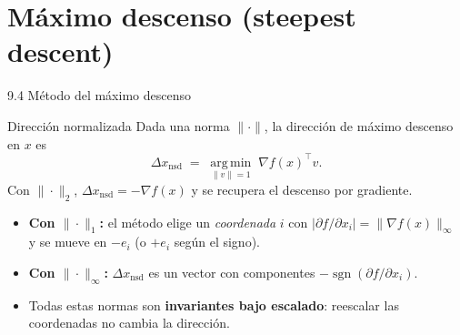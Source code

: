 \documentclass[10pt,aspectratio=169]{beamer}
\newcommand{\argmin}{\operatorname*{arg\,min}}
\begin{document}
\section{Máximo descenso (steepest descent)}
\begin{frame}{9.4 Método del máximo descenso}
  \begin{block}{Dirección normalizada}
    Dada una norma $\|\cdot\|$, la dirección de máximo descenso en $x$ es
    \[
      \Delta x_{\mathrm{nsd}} \;=\; \argmin_{\|v\|=1}\; \nabla f(x)^{\top} v.
    \]
    Con $\|\cdot\|_{2}$, $\Delta x_{\mathrm{nsd}} = -\nabla f(x)$ y se recupera el descenso
    por gradiente.
  \end{block}
  \begin{itemize}
    \item \textbf{Con $\|\cdot\|_{1}$:} el método elige un \emph{coordenada} $i$ con
          $|\partial f/\partial x_{i}| = \|\nabla f(x)\|_{\infty}$ y se mueve en $-e_{i}$
          (o $+e_{i}$ según el signo).
    \item \textbf{Con $\|\cdot\|_{\infty}$:} $\Delta x_{\mathrm{nsd}}$ es un vector con
          componentes $-\operatorname{sgn}(\partial f/\partial x_{i})$.
    \item Todas estas normas son \textbf{invariantes bajo escalado}: reescalar las
          coordenadas no cambia la dirección.
  \end{itemize}
  \begin{center}
  \end{center}
\end{frame}

\end{document}
